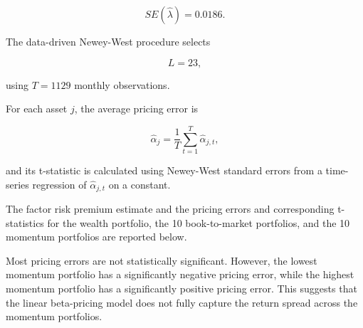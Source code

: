 \documentclass{article}
\begin{document}
\[
SE(\hat{\lambda})=0.0186.
\]

The data-driven Newey-West procedure selects

\[
L=23,
\]

using \(T=1129\) monthly observations.

For each asset \(j\), the average pricing error is

\[
\hat{\alpha}_j
=
\frac{1}{T}
\sum_{t=1}^{T}
\hat{\alpha}_{j,t},
\]

and its t-statistic is calculated using Newey-West standard errors from a time-series regression of \(\hat{\alpha}_{j,t}\) on a constant.

The factor risk premium estimate and the pricing errors and corresponding t-statistics for the wealth portfolio, the 10 book-to-market portfolios, and the 10 momentum portfolios are reported below.



Most pricing errors are not statistically significant. However, the lowest momentum portfolio has a significantly negative pricing error, while the highest momentum portfolio has a significantly positive pricing error. This suggests that the linear beta-pricing model does not fully capture the return spread across the momentum portfolios.
\end{document}
